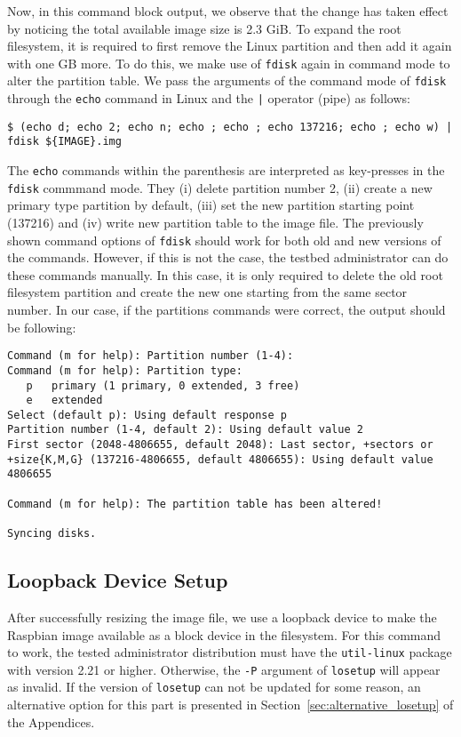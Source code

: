 Now, in this command block output, we observe that the change has taken
effect by noticing the total available image size is 2.3 GiB. To expand the
root filesystem, it is required to first remove the Linux partition
and then add it again with one GB more. To do this, we make use
of \texttt{fdisk} again in command mode to alter the partition table.
We pass the arguments of the command mode of \texttt{fdisk}
through the \texttt{echo} command in Linux and the \texttt{|} operator
(pipe) as follows:

\begin{lstlisting}[]
$ (echo d; echo 2; echo n; echo ; echo ; echo 137216; echo ; echo w) | fdisk ${IMAGE}.img
\end{lstlisting}
\FloatBarrier
\vspace{-5mm}

The \texttt{echo} commands within the parenthesis are interpreted as
key-presses in the \texttt{fdisk} commmand mode. They (i) delete partition
number 2, (ii) create a new primary type partition by default, (iii) set the
new partition starting point (137216) and (iv) write new partition table to
the image file. The previously shown command options of \texttt{fdisk}
should work for both old and new versions of the commands. However, if this
is not the case, the testbed administrator can do these commands manually.
In this case, it is only required to delete the old root
filesystem partition and create the new one starting from the same sector
number. In our case, if the partitions commands were correct, the output
should be following:

\begin{lstlisting}[]
Command (m for help): Partition number (1-4):
Command (m for help): Partition type:
   p   primary (1 primary, 0 extended, 3 free)
   e   extended
Select (default p): Using default response p
Partition number (1-4, default 2): Using default value 2
First sector (2048-4806655, default 2048): Last sector, +sectors or
+size{K,M,G} (137216-4806655, default 4806655): Using default value 4806655

Command (m for help): The partition table has been altered!

Syncing disks.

\end{lstlisting}
\FloatBarrier
\vspace{-5mm}

\subsection{Loopback Device Setup}
After successfully resizing the image file, we use a loopback device to make
the Raspbian image available as a block device in the filesystem. For this
command to work, the tested administrator distribution must have the
\texttt{util-linux} package with version 2.21 or higher. Otherwise, the
\texttt{-P} argument of \texttt{losetup} will appear as invalid. If the
version of \texttt{losetup} can not be updated for some reason, an
alternative option for this part is presented in
Section~\ref{sec:alternative_losetup} of the Appendices.

